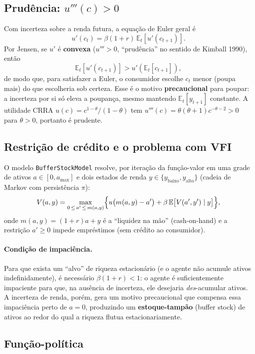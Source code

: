 \documentclass[11pt,a4paper]{article}
\newcommand{\E}{\mathbb{E}}
\begin{document}
\subsection{Prudência: $u'''(c) > 0$}

Com incerteza sobre a renda futura, a equação de Euler geral é
\[
  u'(c_t) = \beta(1+r)\,\E_t[u'(c_{t+1})].
\]
Por Jensen, se $u'$ é \textbf{convexa} ($u'''>0$, ``prudência'' no sentido
de Kimball 1990), então
\[
  \E_t[u'(c_{t+1})] > u'(\E_t[c_{t+1}]),
\]
de modo que, para satisfazer a Euler, o consumidor escolhe $c_t$ menor
(poupa mais) do que escolheria sob certeza. Esse é o motivo
\textbf{precaucional} para poupar: a incerteza por si só eleva a
poupança, mesmo mantendo $\E_t[y_{t+1}]$ constante. A utilidade CRRA
$u(c)=c^{1-\theta}/(1-\theta)$ tem $u'''(c) = \theta(\theta+1)c^{-\theta-2}>0$
para $\theta>0$, portanto é prudente.

\subsection{Restrição de crédito e o problema com VFI}

O modelo \texttt{BufferStockModel} resolve, por iteração da função-valor
em uma grade de ativos $a \in [0, a_{\max}]$ e dois estados de renda
$y \in \{y_{\text{baixo}}, y_{\text{alto}}\}$ (cadeia de Markov com
persistência $\pi$):
\begin{equation}\label{eq:bellman}
  V(a,y) = \max_{0 \,\le\, a' \,\le\, m(a,y)}
    \Bigl\{u\bigl(m(a,y) - a'\bigr) + \beta\,\E\bigl[V(a',y')\mid y\bigr]\Bigr\},
\end{equation}
onde $m(a,y) = (1+r)a + y$ é a ``liquidez na mão'' (cash-on-hand) e a
restrição $a' \ge 0$ impede empréstimos (sem crédito ao consumidor).

\paragraph{Condição de impaciência.}
Para que exista um ``alvo'' de riqueza estacionário (e o agente não
acumule ativos indefinidamente), é necessário $\beta(1+r) < 1$: o agente
é suficientemente impaciente para que, na ausência de incerteza, ele
desejaria \emph{des}-acumular ativos. A incerteza de renda, porém, gera
um motivo precaucional que compensa essa impaciência perto de $a=0$,
produzindo um \textbf{estoque-tampão} (buffer stock) de ativos ao redor
do qual a riqueza flutua estacionariamente.

\subsection{Função-política}
\end{document}
